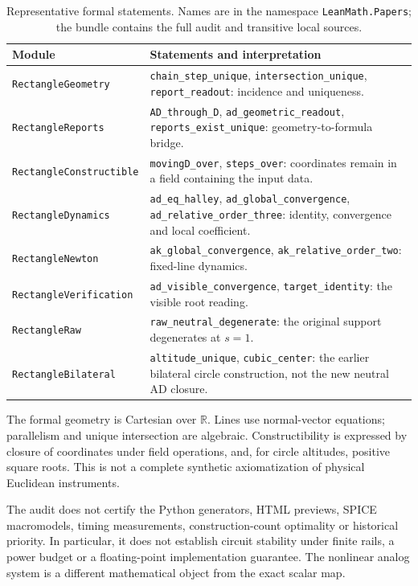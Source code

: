 \documentclass[11pt,a4paper]{article}
\theoremstyle{remark}\newtheorem{remark}[theorem]{Remark}
\numberwithin{equation}{section}
\begin{document}
\begin{table}[htbp]\centering\small
\caption{Representative formal statements. Names are in the namespace \texttt{LeanMath.Papers}; the bundle contains the full audit and transitive local sources.}\label{tab:formal}
\begin{tabularx}{\linewidth}{@{}p{.28\linewidth}X@{}}\toprule
Module & Statements and interpretation\\\midrule
\texttt{RectangleGeometry} & \texttt{chain\_step\_unique}, \texttt{intersection\_unique}, \texttt{report\_readout}: incidence and uniqueness.\\
\texttt{RectangleReports} & \texttt{AD\_through\_D}, \texttt{ad\_geometric\_readout}, \texttt{reports\_exist\_unique}: geometry-to-formula bridge.\\
\texttt{RectangleConstructible} & \texttt{movingD\_over}, \texttt{steps\_over}: coordinates remain in a field containing the input data.\\
\texttt{RectangleDynamics} & \texttt{ad\_eq\_halley}, \texttt{ad\_global\_convergence}, \texttt{ad\_relative\_order\_three}: identity, convergence and local coefficient.\\
\texttt{RectangleNewton} & \texttt{ak\_global\_convergence}, \texttt{ak\_relative\_order\_two}: fixed-line dynamics.\\
\texttt{RectangleVerification} & \texttt{ad\_visible\_convergence}, \texttt{target\_identity}: the visible root reading.\\
\texttt{RectangleRaw} & \texttt{raw\_neutral\_degenerate}: the original support degenerates at $s=1$.\\
\texttt{RectangleBilateral} & \texttt{altitude\_unique}, \texttt{cubic\_center}: the earlier bilateral circle construction, not the new neutral AD closure.\\\bottomrule
\end{tabularx}
\end{table}

The formal geometry is Cartesian over $\mathbb R$. Lines use normal-vector equations; parallelism and unique intersection are algebraic. Constructibility is expressed by closure of coordinates under field operations, and, for circle altitudes, positive square roots. This is not a complete synthetic axiomatization of physical Euclidean instruments.



The audit does not certify the Python generators, HTML previews, SPICE macromodels, timing measurements, construction-count optimality or historical priority. In particular, it does not establish circuit stability under finite rails, a power budget or a floating-point implementation guarantee. The nonlinear analog system is a different mathematical object from the exact scalar map.
\end{document}
